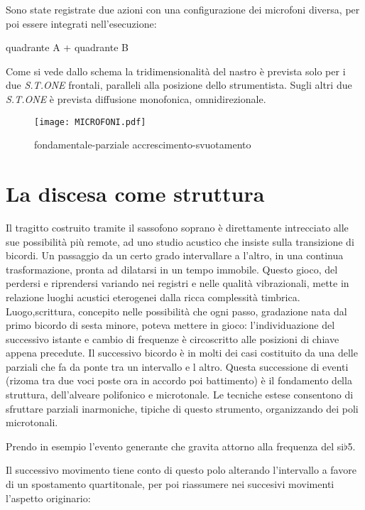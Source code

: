 Sono state registrate due azioni con una configurazione dei microfoni diversa,
per poi essere integrati nell'esecuzione:

\begin{center}
quadrante A + quadrante B
\end{center} 

Come si vede dallo schema la tridimensionalità del nastro è prevista solo per i due
\emph{S.T.ONE} frontali, paralleli alla posizione dello strumentista. Sugli altri due
\emph{S.T.ONE} è prevista diffusione monofonica, omnidirezionale.

\begin{figure}[h]
\centering
{\texttt{[image: MICROFONI.pdf]}}
\caption[Passaggio microtonale]{fondamentale-parziale accrescimento-svuotamento}
\label{fig:microtoni}
\end{figure}

\section{La discesa come struttura}

Il tragitto costruito tramite il sassofono soprano è direttamente intrecciato alle sue
possibilità più remote, ad uno studio acustico che insiste sulla transizione di bicordi.
Un passaggio da un certo grado intervallare a l’altro, in una continua trasformazione, 
pronta ad dilatarsi in un tempo immobile. Questo gioco, del perdersi e riprendersi
variando nei registri e nelle  qualità vibrazionali, mette in relazione luoghi
acustici eterogenei dalla ricca complessità timbrica.
Luogo,scrittura, concepito nelle possibilità che ogni passo, gradazione nata dal
primo bicordo di sesta minore, poteva mettere in gioco: l’individuazione del successivo
istante e cambio di frequenze è circoscritto alle posizioni di chiave appena precedute.
Il successivo bicordo è in molti dei casi costituito da una delle parziali che fa da
ponte tra un intervallo e l altro. 
Questa successione di eventi (rizoma tra due voci poste ora in accordo poi battimento)
è il fondamento della struttura, dell’alveare polifonico e microtonale.
Le tecniche estese consentono di sfruttare parziali inarmoniche, tipiche di questo
strumento, organizzando dei poli microtonali. 

Prendo in esempio l’evento generante che gravita attorno alla frequenza del si{\large$\flat$}5.

Il successivo movimento tiene conto di questo polo alterando l’intervallo a favore
di un spostamento quartitonale, per poi riassumere nei succesivi movimenti l’aspetto originario:

